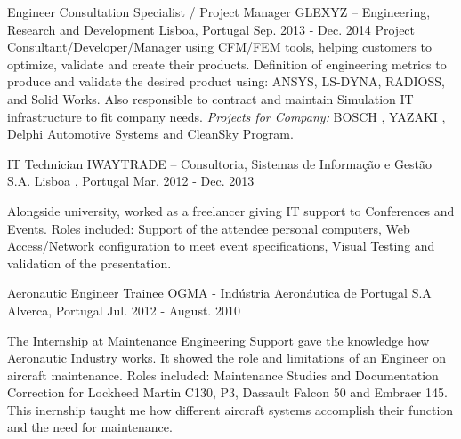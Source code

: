 \begin{cventries}
\cventry
    {Engineer Consultation Specialist / Project Manager}
    {GLEXYZ – Engineering, Research and Development}
    {Lisboa, Portugal}
    {Sep. 2013 - Dec. 2014}
    {
Project Consultant/Developer/Manager using CFM/FEM tools, helping customers to optimize, validate and create their products. Definition of engineering metrics to produce and validate the desired product using: ANSYS, LS-DYNA, RADIOSS, and Solid Works. Also responsible to contract and maintain Simulation IT infrastructure to fit company needs.
\textit{Projects for Company:} BOSCH , YAZAKI , Delphi Automotive Systems and CleanSky Program.
    }
    
    
  \cventry
    {IT Technician}
    {IWAYTRADE – Consultoria, Sistemas de Informação e Gestão S.A.}
    {Lisboa , Portugal}
    {Mar. 2012 - Dec. 2013}
    {
      \begin{cvitems}
        \item {Alongside university, worked as a freelancer giving IT support to Conferences and Events. Roles included: Support of the attendee personal computers, Web Access/Network configuration to meet event specifications, Visual Testing and validation of the presentation.
        }
      \end{cvitems} 
    }
  \cventry
    {Aeronautic Engineer Trainee}
    {OGMA - Indústria Aeronáutica de Portugal S.A}
    {Alverca, Portugal}
    {Jul. 2012 - August. 2010}
    {
      \begin{cvitems}
        \item {The Internship at Maintenance Engineering Support gave the knowledge how Aeronautic Industry works. It showed the role and limitations of an Engineer on aircraft maintenance. Roles included: Maintenance Studies and Documentation Correction for Lockheed Martin C130, P3, Dassault Falcon 50 and Embraer 145. This inernship taught me how different aircraft systems accomplish their function and the need for maintenance.}
      \end{cvitems}
    }
\end{cventries}
